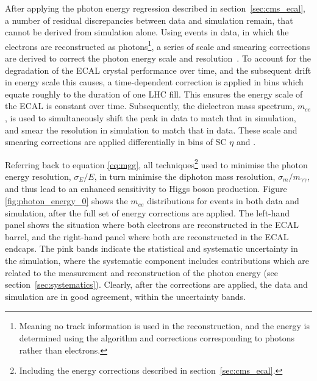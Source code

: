 After applying the photon energy regression described in section~\ref{sec:cms_ecal}, a number of residual discrepancies between data and simulation remain, that cannot be derived from simulation alone. Using \Zee events in data, in which the electrons are reconstructed as photons\footnote{Meaning no track information is used in the reconstruction, and the energy is determined using the algorithm and corrections corresponding to photons rather than electrons.}, a series of scale and smearing corrections are derived to correct the photon energy scale and resolution~\cite{Sirunyan:2020xwk}. To account for the degradation of the ECAL crystal performance over time, and the subsequent drift in energy scale this causes, a time-dependent correction is applied in bins which equate roughly to the duration of one LHC fill. This ensures the energy scale of the ECAL is constant over time. Subsequently, the dielectron mass spectrum, $m_{ee}$, is used to simultaneously shift the peak in data to match that in simulation, and smear the resolution in simulation to match that in data. These scale and smearing corrections are applied differentially in bins of SC $\eta$ and \RNINE. 

Referring back to equation \ref{eq:mgg}, all techniques\footnote{Including the energy corrections described in section~\ref{sec:cms_ecal}.} used to minimise the photon energy resolution, $\sigma_E/E$, in turn minimise the diphoton mass resolution, $\sigma_m/m_{\gamma\gamma}$, and thus lead to an enhanced sensitivity to Higgs boson production. Figure \ref{fig:photon_energy_0} shows the $m_{ee}$ distributions for \Zee events in both data and simulation, after the full set of energy corrections are applied. The left-hand panel shows the situation where both electrons are reconstructed in the ECAL barrel, and the right-hand panel where both are reconstructed in the ECAL endcaps. The pink bands indicate the statistical and systematic uncertainty in the simulation, where the systematic component includes contributions which are related to the measurement and reconstruction of the photon energy (see section~\ref{sec:systematics}). Clearly, after the corrections are applied, the data and simulation are in good agreement, within the uncertainty bands.

